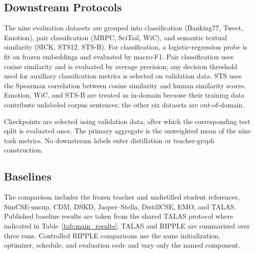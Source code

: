 \subsection{Downstream Protocols}

The nine evaluation datasets are grouped into classification (Banking77, Tweet, Emotion), pair classification (MRPC, SciTail, WiC), and semantic textual similarity (SICK, STS12, STS-B). For classification, a logistic-regression probe is fit on frozen embeddings and evaluated by macro-F1. Pair classification uses cosine similarity and is evaluated by average precision; any decision threshold used for auxiliary classification metrics is selected on validation data. STS uses the Spearman correlation between cosine similarity and human similarity scores. Emotion, WiC, and STS-B are treated as in-domain because their training data contribute unlabeled corpus sentences; the other six datasets are out-of-domain.

Checkpoints are selected using validation data, after which the corresponding test split is evaluated once. The primary aggregate is the unweighted mean of the nine task metrics. No downstream labels enter distillation or teacher-graph construction.

\subsection{Baselines}

The comparison includes the frozen teacher and undistilled student references, SimCSE-unsup, CDM, DSKD, Jasper--Stella, DistillCSE, EMO, and TALAS. Published baseline results are taken from the shared TALAS protocol where indicated in Table~\ref{tab:main_results}; TALAS and RIPPLE are summarized over three runs. Controlled RIPPLE comparisons use the same initialization, optimizer, schedule, and evaluation code and vary only the named component.
